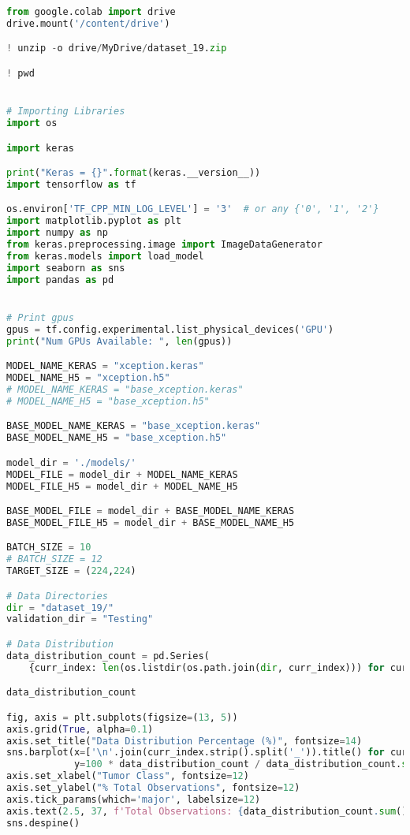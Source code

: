 \begin{lstlisting}[language=Python]
from google.colab import drive
drive.mount('/content/drive')

! unzip -o drive/MyDrive/dataset_19.zip

! pwd


# Importing Libraries
import os

import keras

print("Keras = {}".format(keras.__version__))
import tensorflow as tf

os.environ['TF_CPP_MIN_LOG_LEVEL'] = '3'  # or any {'0', '1', '2'}
import matplotlib.pyplot as plt
import numpy as np
from keras.preprocessing.image import ImageDataGenerator
from keras.models import load_model
import seaborn as sns
import pandas as pd


# Print gpus
gpus = tf.config.experimental.list_physical_devices('GPU')
print("Num GPUs Available: ", len(gpus))

MODEL_NAME_KERAS = "xception.keras"
MODEL_NAME_H5 = "xception.h5"
# MODEL_NAME_KERAS = "base_xception.keras"
# MODEL_NAME_H5 = "base_xception.h5"

BASE_MODEL_NAME_KERAS = "base_xception.keras"
BASE_MODEL_NAME_H5 = "base_xception.h5"

model_dir = './models/'
MODEL_FILE = model_dir + MODEL_NAME_KERAS
MODEL_FILE_H5 = model_dir + MODEL_NAME_H5

BASE_MODEL_FILE = model_dir + BASE_MODEL_NAME_KERAS
BASE_MODEL_FILE_H5 = model_dir + BASE_MODEL_NAME_H5

BATCH_SIZE = 10
# BATCH_SIZE = 12
TARGET_SIZE = (224,224)

# Data Directories
dir = "dataset_19/"
validation_dir = "Testing"

# Data Distribution
data_distribution_count = pd.Series(
    {curr_index: len(os.listdir(os.path.join(dir, curr_index))) for curr_index in os.listdir(dir)})

data_distribution_count

fig, axis = plt.subplots(figsize=(13, 5))
axis.grid(True, alpha=0.1)
axis.set_title("Data Distribution Percentage (%)", fontsize=14)
sns.barplot(x=['\n'.join(curr_index.strip().split('_')).title() for curr_index in data_distribution_count.index],
            y=100 * data_distribution_count / data_distribution_count.sum(), ax=axis)
axis.set_xlabel("Tumor Class", fontsize=12)
axis.set_ylabel("% Total Observations", fontsize=12)
axis.tick_params(which='major', labelsize=12)
axis.text(2.5, 37, f'Total Observations: {data_distribution_count.sum()}', fontdict=dict(size=12))
sns.despine()

\end{lstlisting}

